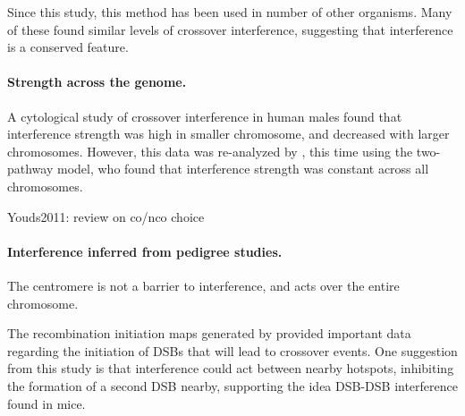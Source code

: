 Since this study, this method has been used in number of other organisms\cite{Barchi2008,Basheva2008}.
%
Many of these found similar levels of crossover interference, suggesting that interference is a conserved feature.

\paragraph{Strength across the genome.}
A cytological study of crossover interference in human males\cite{Lian2008} found that interference strength was high in smaller chromosome, and decreased with larger chromosomes.
However, this data was re-analyzed by \citet{Housworth2009}, this time using the two-pathway model, who found that interference strength was constant across all chromosomes.



Youds2011: review on co/nco choice

\paragraph{Interference inferred from pedigree studies.}

The centromere is not a barrier to interference\cite{Broman2000,Fledel-Alon2009}, and acts over the entire chromosome.

The recombination initiation maps generated by \citet{Pratto2014} provided important data regarding the initiation of DSBs that will lead to crossover events.
One suggestion from this study is that interference could act between nearby hotspots, inhibiting the formation of a second DSB nearby, supporting the idea DSB-DSB interference found in mice.

